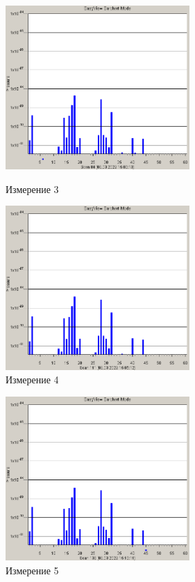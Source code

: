 \documentclass[a4paper,12pt]{article} %
\begin{document}
\begin{figure}[h]
\begin{center}
\begin{minipage}[h]{7cm}
\includegraphics[width=7cm]{spect_3.png}
\caption{Измерение 3} 
\label{spect3}
\end{minipage}
\hfill
\begin{minipage}[h]{7cm}
\includegraphics[width=7cm]{spect_4.png}
\caption{Измерение 4}
\label{spect4}
\end{minipage}
\end{center}
\end{figure}

\begin{figure}[h]
\center
\includegraphics[width=7cm]{spect_5.png}
\caption{Измерение 5}
\label{spect5}
\end{figure}
\end{document}
